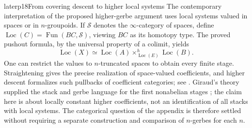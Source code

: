 \begin{dcomment}{later}{p18}{From covering descent to higher local systems}
The contemporary interpretation of the proposed higher-gerbe argument uses local systems valued in spaces or in $n$-groupoids. If $\mathcal S$ denotes the $\infty$-category of spaces, define $\operatorname{Loc}(C)=\operatorname{Fun}(BC,\mathcal S)$, viewing $BC$ as its homotopy type. The proved pushout formula, by the universal property of a colimit, yields
\[
 \operatorname{Loc}(X)\simeq
 \operatorname{Loc}(A)\times^h_{\operatorname{Loc}(E)}
 \operatorname{Loc}(B).
\]
One can restrict the values to $n$-truncated spaces to obtain every finite stage. Straightening gives the precise realization of space-valued coefficients, and higher descent formalizes such pullbacks of coefficient categories; see \citet[Theorem~2.2.1.2, Corollary~3.3.4.6, and Theorem~6.1.3.9]{Lurie2009HTT}. Giraud's theory supplied the stack and gerbe language for the first nonabelian stages \citep{Giraud1971}; the claim here is about locally constant higher coefficients, not an identification of all stacks with local systems. The categorical question of the appendix is therefore settled without requiring a separate construction and comparison of $n$-gerbes for each $n$.
\end{dcomment}
